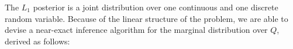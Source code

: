 \documentclass[OpenMind]{stjour}
\newcommand{\Listener}{L}
\newcommand{\QLONE}{\Listener_{{1}}^{{Q}}}
\begin{document}
























	The $L_1$ posterior is a joint distribution over one continuous and one discrete random variable. 
	Because of the linear structure of the problem, we are able to devise a near-exact inference algorithm for the marginal distribution over $Q$, derived as follows:



\end{document}

